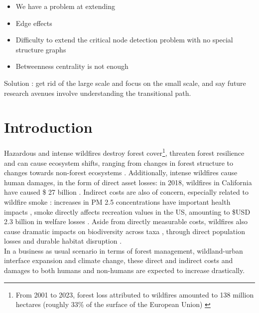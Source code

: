 \vfill
\newpage


\begin{itemize}
\item We have a problem at extending
\item Edge effects
\item Difficulty to extend the critical node detection problem with no special structure graphs
\item Betweenness centrality is not enough
\end{itemize}
Solution : get rid of the large scale and focus on the small scale, and say future research avenues involve understanding the transitional path.
\newpage


\section{Introduction}
\hspace*{1.5em}Hazardous and intense wildfires destroy forest cover\footnote{From 2001 to 2023, forest loss attributed to wildfires amounted to 138 million hectares (roughly 33\% of the surface of the European Union) \citep{tyukavina_global_2022}}, threaten forest resilience and can cause ecosystem shifts, ranging from changes in forest structure to changes towards non-forest ecosystems \citep{coop_wildfire-driven_2020}. 
Additionally, intense wildfires cause human damages, in the form of direct asset losses: in 2018, wildfires in California have caused \$ 27 billion \citep{wang_economic_2021}. Indirect costs are also of concern, especially related to wildfire smoke : increases in PM 2.5 concentrations have important health impacts \citep{burke_wildfire_2023, heft-neal_behavior_2023}, smoke directly affects recreation values in the US, amounting to \$USD 2.3 billion in welfare losses \citep{Gellman}. Aside from directly measurable costs, wildfires also cause dramatic impacts on biodiversity across taxa \citep{Wintle2020}, through direct population losses and durable habitat disruption \citep{Ayars2023}.
%
\\
\hspace*{1.5em}In a business as usual scenario in terms of forest management, wildland-urban interface expansion and climate change, these direct and indirect costs and damages to both humans and non-humans are expected to increase drastically.
%
\\
